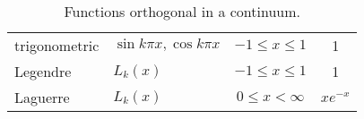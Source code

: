 \begin{table}[t]
	\begin{center}
		\begin{tabular}{llcc}
		  trigonometric & $\sin k \pi x, \cos k \pi x$ & $-1 \le x \le 1$ & 1 \\
		  Legendre & $L_{k}(x)$ & $-1 \le x \le 1$ & 1\\
		  Laguerre & $L_{k}(x)$ & $0 \le x < \infty$ & $xe^{-x}$
		\end{tabular}
	\end{center}
	\caption{Functions orthogonal in a continuum.}
\end{table}%

\endinput  %


